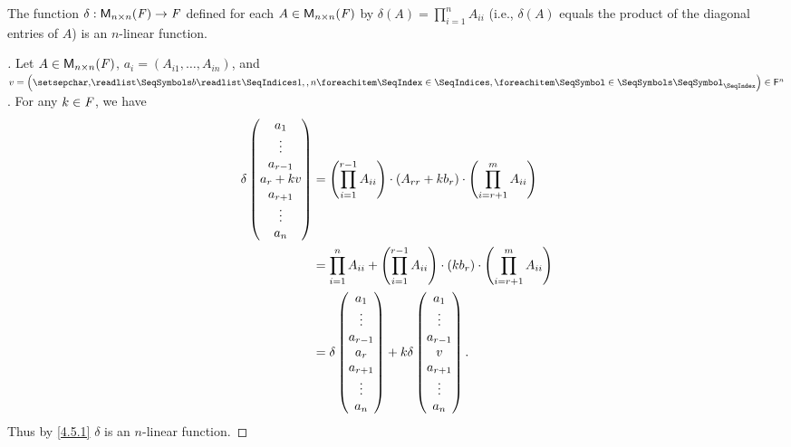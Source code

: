 \begin{eg}\label{4.5.4}
	The function \(\delta : \mathsf{M}_{{n} \times n}({\mathit{F}}) \to \mathit{F}\) defined for each \(A \in \mathsf{M}_{{n} \times n}({\mathit{F}})\) by \(\delta(A) = \prod_{i = 1}^n A_{i i}\) (i.e., \(\delta(A)\) equals the product of the diagonal entries of \(A\)) is an \(n\)-linear function.
\end{eg}

\begin{proof}[]
	Let \(A \in \mathsf{M}_{{n} \times n}({\mathit{F}})\), \(a_i = (A_{i 1}, \dots, A_{i n})\), and \(v = \tuple{b}{1,,n} \in \vs{F}^n\).
	For any \(k \in \mathit{F}\), we have
	\begin{align*}
		\delta\begin{pmatrix}
			      a_1       \\
			      \vdots    \\
			      a_{r - 1} \\
			      a_r + kv  \\
			      a_{r + 1} \\
			      \vdots    \\
			      a_n
		      \end{pmatrix} & = \left\lparen\prod_{i = 1}^{r - 1} A_{i i}\right\rparen \cdot (A_{r r} + k b_r) \cdot \left\lparen\prod_{i = r + 1}^m A_{i i}\right\rparen                   \\
		                      & = \prod_{i = 1}^n A_{i i} + \left\lparen\prod_{i = 1}^{r - 1} A_{i i}\right\rparen \cdot (k b_r) \cdot \left\lparen\prod_{i = r + 1}^m A_{i i}\right\rparen \\
		                      & = \delta\begin{pmatrix}
			                                a_1       \\
			                                \vdots    \\
			                                a_{r - 1} \\
			                                a_r       \\
			                                a_{r + 1} \\
			                                \vdots    \\
			                                a_n
		                                \end{pmatrix} + k \delta\begin{pmatrix}
			                                                        a_1       \\
			                                                        \vdots    \\
			                                                        a_{r - 1} \\
			                                                        v         \\
			                                                        a_{r + 1} \\
			                                                        \vdots    \\
			                                                        a_n
		                                                        \end{pmatrix}.
	\end{align*}
	Thus by \cref{4.5.1} \(\delta\) is an \(n\)-linear function.
\end{proof}

